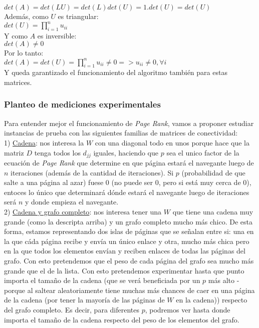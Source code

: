 				$det(A) = det(LU) = det(L)det(U) = 1.det(U) = det(U)$ \\

				Además, como $U$ es triangular: \\

				$det(U) = \prod_{i=1}^{n} u_{ii}$ \\

				Y como $A$ es inversible: \\

				$det(A) \neq 0$ \\

				Por lo tanto: \\

				$det(A) = det(U) = \prod_{i=1}^{n} u_{ii} \neq 0 => u_{ii} \neq 0, \forall i$ \\

				Y queda garantizado el funcionamiento del algoritmo también para estas matrices. \\

		\subsubsection{Planteo de mediciones experimentales}

			Para entender mejor el funcionamiento de \textit{Page Rank}, vamos a proponer estudiar instancias de prueba con las siguientes familias de matrices de conectividad:\\

			1) \underline{Cadena}: nos interesa la $W$ con una diagonal todo en unos porque hace que la matriz $D$ tenga todos los $d_{jj}$ iguales, haciendo que $p$ sea el unico factor de la ecuación de \textit{Page Rank} que determine en que página estará el navegante luego de $n$ iteraciones (además de la cantidad de iteraciones). Si $p$ (probabilidad de que salte a una página al azar) fuese $0$ (no puede ser $0$, pero si está muy cerca de $0$), entoces lo único que determinará dónde estará el navegante luego de iteraciones será $n$ y donde empieza el navegante. \\

			2) \underline{Cadena y grafo completo}: nos interesa tener una $W$ que tiene una cadena muy grande (como la descripta arriba) y un grafo completo mucho más chico. De esta forma, estamos representando dos islas de páginas que se señalan entre si: una en la que cáda página recibe y envía un único enlace y otra, mucho más chica pero en la que todos los elementos envían y reciben enlaces de todas las páginas del grafo. Con esto pretendemos que el peso de cada página del grafo sea mucho más grande que el de la lista. Con esto pretendemos experimentar hasta que punto importa el tamaño de la cadena (que se verá beneficiada por un $p$ más alto -porque al saltear aleatoriamente tiene muchas más chances de caer en una página de la cadena (por tener la mayoría de las páginas de $W$ en la cadena)) respecto del grafo completo. Es decir, para diferentes $p$, podremos ver hasta donde importa el tamaño de la cadena respecto del peso de los elementos del grafo. \\

